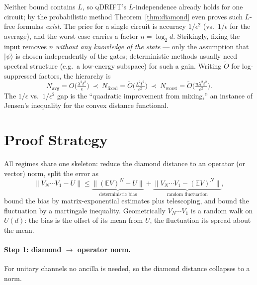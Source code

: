 ﻿\documentclass[12pt]{article}
\theoremstyle{plain}
\theoremstyle{definition}
\newcommand{\norm}[1]{\lVert #1 \rVert}
\newcommand{\E}{\mathbb{E}}
\newcommand{\ket}[1]{\lvert #1 \rangle}
\newcommand{\Otil}{\widetilde{O}}
\begin{document}
	Neither bound contains $L$, so \textsc{qDRIFT}'s $L$-independence already holds for one
	circuit; by the probabilistic method Theorem~\ref{thm:diamond} even proves such $L$-free
	formulas \emph{exist}. The price for a single circuit is accuracy $1/\epsilon^2$ (vs.\
	$1/\epsilon$ for the average), and the worst case carries a factor $n=\log_2 d$. Strikingly,
	fixing the input removes $n$ \emph{without any knowledge of the state} --- only the assumption
	that $\ket\psi$ is chosen independently of the gates; deterministic methods usually need
	spectral structure (e.g.\ a low-energy subspace) for such a gain. Writing $\Otil$ for
	log-suppressed factors, the hierarchy is
	\[
	N_{\mathrm{avg}}=O\big(\tfrac{\lambda^2t^2}{\epsilon}\big)\ \prec\
	N_{\mathrm{fixed}}=\Otil\big(\tfrac{\lambda^2t^2}{\epsilon^2}\big)\ \prec\
	N_{\mathrm{worst}}=\Otil\big(\tfrac{n\lambda^2t^2}{\epsilon^2}\big).
	\]
	The $1/\epsilon$ vs.\ $1/\epsilon^2$ gap is the ``quadratic improvement from mixing,'' an
	instance of Jensen's inequality for the convex distance functional.
	
	
	\section{Proof Strategy}
	
	All regimes share one skeleton: reduce the diamond distance to an operator (or vector) norm,
	split the error as
	\begin{equation}
		\norm{V_N\cdots V_1-U}\le\underbrace{\norm{(\E V)^N-U}}_{\text{deterministic bias}}+\underbrace{\norm{V_N\cdots V_1-(\E V)^N}}_{\text{random fluctuation}},
		\label{eq:decomp}
	\end{equation}
	bound the bias by matrix-exponential estimates plus telescoping, and bound the fluctuation by
	a martingale inequality. Geometrically $V_N\cdots V_1$ is a random walk on $U(d)$: the bias is
	the offset of its mean from $U$, the fluctuation its spread about the mean.
	
	\paragraph{Step 1: diamond $\to$ operator norm.}
	For unitary channels no ancilla is needed, so the diamond distance collapses to a norm.
	
\end{document}
